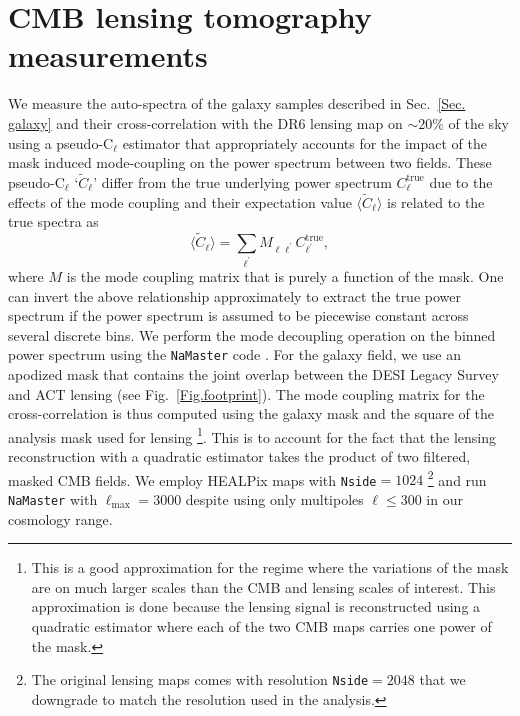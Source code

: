 \documentclass[twocolumn]{aastex631}
\begin{document}
{\section{CMB lensing tomography measurements}\label{ref.measurement}
We measure the auto-spectra of the galaxy samples described in Sec.~\ref{Sec. galaxy} and their cross-correlation with the DR6 lensing map on $\sim20\%$ of the sky using a pseudo-C$_\ell$ estimator that appropriately accounts for the impact of the mask induced mode-coupling on the power spectrum between two fields. These pseudo-C$_\ell$ `$\tilde{C}_\ell$' differ from the true underlying power spectrum $C^{\mathrm{true}}_\ell$ due to the effects of the mode coupling and their expectation value $\langle\tilde{C}_\ell\rangle$ is related to the true spectra as \citep{2002ApJ...567....2H}
\begin{equation}
\langle\tilde{C}_\ell\rangle=\sum_{\ell^\prime}M_{\ell\ell^\prime}C^\mathrm{true}_{\ell^\prime},
\end{equation}
where $M$ is the mode coupling matrix that is purely a function of the mask. One can invert the above relationship approximately to extract the true power spectrum if the power spectrum is assumed to be piecewise constant across several discrete bins. We perform the mode decoupling operation on the binned power spectrum using the \texttt{NaMaster} code \citep{Alonso_2019}. For the galaxy field, we use an apodized mask that contains the joint overlap between the DESI Legacy Survey  and ACT lensing (see Fig.~\ref{Fig.footprint}).
The mode coupling matrix for the cross-correlation is thus computed using the galaxy mask and the square of the analysis mask used for lensing \footnote{This is a good approximation for the regime where the variations of the mask are on much larger scales than the CMB and lensing scales of interest. This approximation is done because the lensing signal is reconstructed using a quadratic estimator where each of the two CMB maps carries one power of the mask.}. This is to account for the fact that the lensing reconstruction with a quadratic estimator takes the product of two filtered, masked CMB fields.  We employ HEALPix maps with \texttt{Nside}$=1024$ \footnote{The original lensing maps comes with resolution \texttt{Nside}$=2048$ that we downgrade to match the resolution used in the analysis. } and run \texttt{NaMaster} with $\ell_\mathrm{max}=3000$  despite using only multipoles $\ell\leq300$ in our cosmology range.

}
\end{document}
